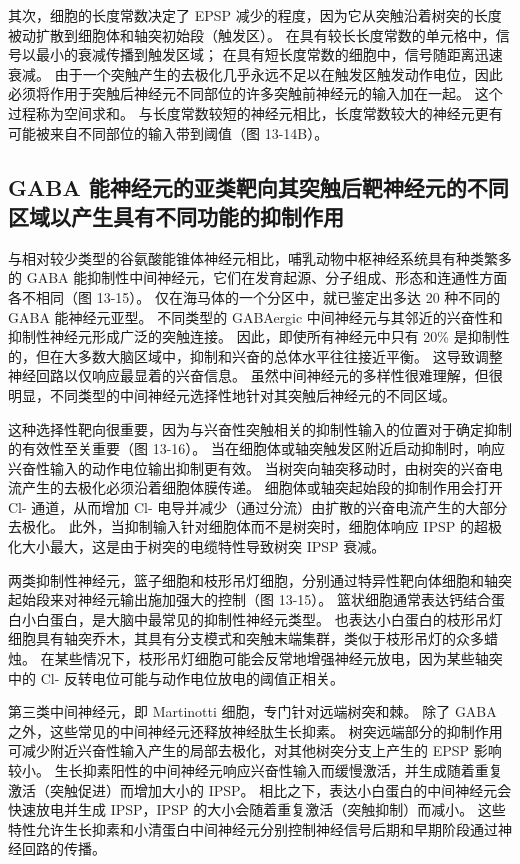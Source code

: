 其次，细胞的长度常数决定了 EPSP 减少的程度，因为它从突触沿着树突的长度被动扩散到细胞体和轴突初始段（触发区）。 在具有较长长度常数的单元格中，信号以最小的衰减传播到触发区域； 在具有短长度常数的细胞中，信号随距离迅速衰减。 由于一个突触产生的去极化几乎永远不足以在触发区触发动作电位，因此必须将作用于突触后神经元不同部位的许多突触前神经元的输入加在一起。 这个过程称为空间求和。 与长度常数较短的神经元相比，长度常数较大的神经元更有可能被来自不同部位的输入带到阈值（图 13-14B）。

\subsection{GABA 能神经元的亚类靶向其突触后靶神经元的不同区域以产生具有不同功能的抑制作用}
与相对较少类型的谷氨酸能锥体神经元相比，哺乳动物中枢神经系统具有种类繁多的 GABA 能抑制性中间神经元，它们在发育起源、分子组成、形态和连通性方面各不相同（图 13-15）。 仅在海马体的一个分区中，就已鉴定出多达 20 种不同的 GABA 能神经元亚型。 不同类型的 GABAergic 中间神经元与其邻近的兴奋性和抑制性神经元形成广泛的突触连接。 因此，即使所有神经元中只有 20\% 是抑制性的，但在大多数大脑区域中，抑制和兴奋的总体水平往往接近平衡。 这导致调整神经回路以仅响应最显着的兴奋信息。 虽然中间神经元的多样性很难理解，但很明显，不同类型的中间神经元选择性地针对其突触后神经元的不同区域。

这种选择性靶向很重要，因为与兴奋性突触相关的抑制性输入的位置对于确定抑制的有效性至关重要（图 13-16）。 当在细胞体或轴突触发区附近启动抑制时，响应兴奋性输入的动作电位输出抑制更有效。 当树突向轴突移动时，由树突的兴奋电流产生的去极化必须沿着细胞体膜传递。 细胞体或轴突起始段的抑制作用会打开 Cl- 通道，从而增加 Cl- 电导并减少（通过分流）由扩散的兴奋电流产生的大部分去极化。 此外，当抑制输入针对细胞体而不是树突时，细胞体响应 IPSP 的超极化大小最大，这是由于树突的电缆特性导致树突 IPSP 衰减。

两类抑制性神经元，篮子细胞和枝形吊灯细胞，分别通过特异性靶向体细胞和轴突起始段来对神经元输出施加强大的控制（图 13-15）。 篮状细胞通常表达钙结合蛋白小白蛋白，是大脑中最常见的抑制性神经元类型。 也表达小白蛋白的枝形吊灯细胞具有轴突乔木，其具有分支模式和突触末端集群，类似于枝形吊灯的众多蜡烛。 在某些情况下，枝形吊灯细胞可能会反常地增强神经元放电，因为某些轴突中的 Cl- 反转电位可能与动作电位放电的阈值正相关。

第三类中间神经元，即 Martinotti 细胞，专门针对远端树突和棘。 除了 GABA 之外，这些常见的中间神经元还释放神经肽生长抑素。 树突远端部分的抑制作用可减少附近兴奋性输入产生的局部去极化，对其他树突分支上产生的 EPSP 影响较小。 生长抑素阳性的中间神经元响应兴奋性输入而缓慢激活，并生成随着重复激活（突触促进）而增加大小的 IPSP。 相比之下，表达小白蛋白的中间神经元会快速放电并生成 IPSP，IPSP 的大小会随着重复激活（突触抑制）而减小。 这些特性允许生长抑素和小清蛋白中间神经元分别控制神经信号后期和早期阶段通过神经回路的传播。

